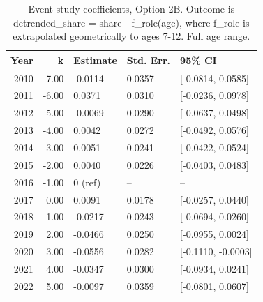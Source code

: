 \begin{table}[ht]
\centering
\caption{Event-study coefficients, Option 2B. Outcome is detrended_share = share - f_role(age), where f_role is extrapolated geometrically to ages 7-12. Full age range.} 
\label{tab:phase4_within_intensive_did_prepolicy_baseline_eventstudy_2b}
\begin{tabular}{rrlll}
  \toprule
Year & k & Estimate & Std. Err. & 95\% CI \\ 
  \midrule
2010 & -7.00 & -0.0114 & 0.0357 & [-0.0814, 0.0585] \\ 
  2011 & -6.00 & 0.0371 & 0.0310 & [-0.0236, 0.0978] \\ 
  2012 & -5.00 & -0.0069 & 0.0290 & [-0.0637, 0.0498] \\ 
  2013 & -4.00 & 0.0042 & 0.0272 & [-0.0492, 0.0576] \\ 
  2014 & -3.00 & 0.0051 & 0.0241 & [-0.0422, 0.0524] \\ 
  2015 & -2.00 & 0.0040 & 0.0226 & [-0.0403, 0.0483] \\ 
  2016 & -1.00 & 0 (ref) & -- & -- \\ 
  2017 & 0.00 & 0.0091 & 0.0178 & [-0.0257, 0.0440] \\ 
  2018 & 1.00 & -0.0217 & 0.0243 & [-0.0694, 0.0260] \\ 
  2019 & 2.00 & -0.0466 & 0.0250 & [-0.0955, 0.0024] \\ 
  2020 & 3.00 & -0.0556 & 0.0282 & [-0.1110, -0.0003] \\ 
  2021 & 4.00 & -0.0347 & 0.0300 & [-0.0934, 0.0241] \\ 
  2022 & 5.00 & -0.0097 & 0.0359 & [-0.0801, 0.0607] \\ 
   \bottomrule
\end{tabular}
\end{table}
